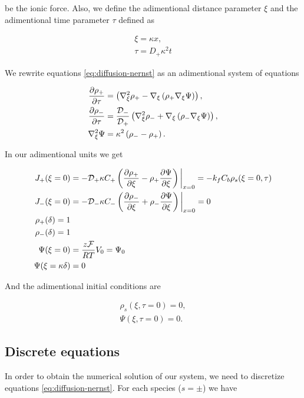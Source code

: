 be the ionic force. Also, we define the adimentional distance parameter $\xi$ and the adimentional time parameter $\tau$ defined as

\begin{align}
	\xi = \kappa x, \\
	\tau = D_+\kappa^2 t
\end{align}

We rewrite equations \ref{eq:diffusion-nernst} as an adimentional system of equations

\begin{align}
\label{eq:adimetional-diffusion-nernst}
    \frac{\partial \rho_+}{\partial \tau} &= \left({\nabla_\xi^2 \rho_+ - \nabla_\xi\left({\rho_+ \nabla_\xi \Psi}\right)}\right), \\
    \frac{\partial \rho_-}{\partial \tau} &= \frac{\mathcal{D}_-}{\mathcal{D_+}}\left({\nabla_\xi^2 \rho_- + \nabla_\xi\left({\rho_- \nabla_\xi \Psi}\right)}\right), \\
    \nabla_\xi^2 \Psi &= \kappa^2\left({\rho_- - \rho_+}\right).
\end{align}


In our adimentional units we get

\begin{align}
    J_+(\xi = 0) &= -\mathcal{D}_+\kappa C_+\left({\frac{\partial \rho_+}{\partial \xi} - \rho_+ \frac{\partial\Psi}{\partial \xi}}\right)\bigg|_{x= 0}= -k_f C_b\rho_s(\xi = 0, \tau)\\
    J_-(\xi = 0) &= -\mathcal{D}_-\kappa C_-\left({\frac{\partial \rho_-}{\partial \xi} + \rho_- \frac{\partial\Psi}{\partial \xi}}\right)  \bigg|_{x= 0} = 0\\
    \rho_+(\delta) = 1\\
    \rho_-(\delta) = 1\\
    \Psi(\xi = 0) &= \frac{z\mathcal{F}}{RT} V_0 = \Psi_0\\
    \Psi(\xi = \kappa \delta) &= 0
\end{align}

And the adimentional initial conditions are

\begin{align}
	\rho_s(\xi, \tau = 0) = 0,\\
	\Psi (\xi, \tau = 0) = 0.
\end{align}


\subsection{Discrete equations}

In order to obtain the numerical solution of our system, we need to discretize equations \ref{eq:diffusion-nernst}. For each species ($s = \pm$) we have

